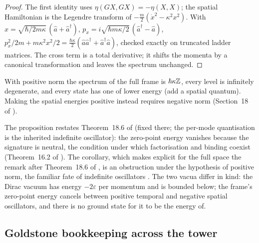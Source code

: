 \begin{proof}
The first identity uses $\eta(GX,GX)=-\eta(X,X)$; the spatial Hamiltonian is the Legendre transform of $-\tfrac m2(\dot x^2-\kappa^2x^2)$. With
$x=\sqrt{\hbar/2m\kappa}\,(\hat a+\hat a^\dagger)$, $p_x=i\sqrt{\hbar m\kappa/2}\,(\hat a^\dagger-\hat a)$, $p_x^2/2m+m\kappa^2x^2/2=\tfrac{\hbar\kappa}2(\hat a\hat a^\dagger+\hat a^\dagger\hat a)$,
checked exactly on truncated ladder matrices. The cross term is a total derivative; it shifts the momenta by a canonical transformation and leaves
the spectrum unchanged.
\end{proof}

\begin{corollary}
\label{d2:cor:noground}
With positive norm the spectrum of the full frame is $\hbar\kappa\mathbb{Z}$, every level is infinitely degenerate, and every state has one of lower energy
(add a spatial quantum). Making the spatial energies positive instead requires negative norm (Section~18 of \cite{ES17}).
\end{corollary}

The proposition restates Theorem~18.6 of \cite{ES17} (fixed there; the per-mode quantisation is the inherited indefinite oscillator): the zero-point
energy vanishes because the signature is neutral, the condition under which factorisation and binding coexist (Theorem~16.2 of \cite{ES17}). The
corollary, which makes explicit for the full space the remark after Theorem~18.6 of \cite{ES17}, is an obstruction under the hypothesis of positive
norm, the familiar fate of indefinite oscillators \cite{PaisUhlenbeck50}. The two vacua differ in kind: the Dirac vacuum has energy $-2\varepsilon$ per
momentum and is bounded below; the frame's zero-point energy cancels between positive temporal and negative spatial oscillators, and there is no
ground state for it to be the energy of.

\subsection{Goldstone bookkeeping across the tower}
\label{d2:sec:goldstone}

